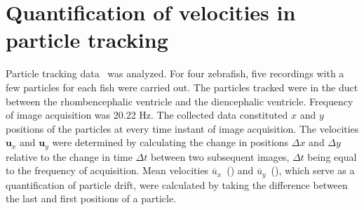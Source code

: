 \documentclass[fleqn]{wlscirep}
\newcommand{\uu}{\mathbf{u}}
\begin{document}
\section{Quantification of velocities in particle tracking}\label{sec:appC_particle_transport}
Particle tracking data~\cite{Olstad2019CiliaryDevelopment} was analyzed.
For four zebrafish, five recordings with a few particles for each fish were carried out.
The particles tracked were in the duct between the rhombencephalic ventricle and the
diencephalic ventricle. Frequency of image acquisition was 20.22 Hz.
The collected data constituted $x$ and $y$ positions of the particles at every time
instant of image acquisition. The velocities $\uu_x$ and $\uu_y$ were determined by
calculating the change in positions $\Delta x$ and $\Delta y$ relative to the change
in time $\Delta t$ between two subsequent images, $\Delta t$ being equal to the frequency of acquisition.
Mean velocities $\overline{u}_x$~() and $\overline{u}_y$~(),
which serve as a quantification of particle drift, were calculated
by taking the difference between the last and first positions of a particle.
\end{document}
